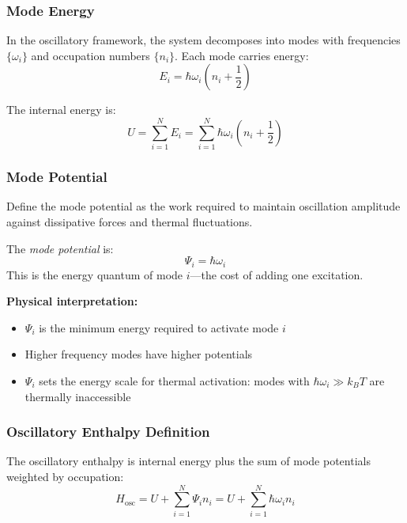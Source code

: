 \subsubsection{Mode Energy}

In the oscillatory framework, the system decomposes into modes with frequencies $\{\omega_i\}$ and occupation numbers $\{n_i\}$. Each mode carries energy:
\begin{equation}
E_i = \hbar\omega_i \left(n_i + \frac{1}{2}\right)
\end{equation}

The internal energy is:
\begin{equation}
U = \sum_{i=1}^{N} E_i = \sum_{i=1}^{N} \hbar\omega_i \left(n_i + \frac{1}{2}\right)
\end{equation}

\subsubsection{Mode Potential}

Define the mode potential as the work required to maintain oscillation amplitude against dissipative forces and thermal fluctuations.

\begin{definition}
The \textit{mode potential} is:
\begin{equation}
\Psi_i = \hbar\omega_i
\end{equation}
This is the energy quantum of mode $i$---the cost of adding one excitation.
\end{definition}

\textbf{Physical interpretation:}
\begin{itemize}
\item $\Psi_i$ is the minimum energy required to activate mode $i$
\item Higher frequency modes have higher potentials
\item $\Psi_i$ sets the energy scale for thermal activation: modes with $\hbar\omega_i \gg k_B T$ are thermally inaccessible
\end{itemize}

\subsubsection{Oscillatory Enthalpy Definition}

The oscillatory enthalpy is internal energy plus the sum of mode potentials weighted by occupation:
\begin{equation}
\boxed{H_{\text{osc}} = U + \sum_{i=1}^{N} \Psi_i n_i = U + \sum_{i=1}^{N} \hbar\omega_i n_i}
\label{eq:oscillatory_enthalpy}
\end{equation}


